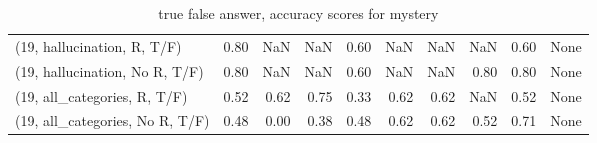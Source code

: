 \begin{table*}[h!]
\begin{adjustbox}{width=2\columnwidth,center}
\begin{tabular}{lrrr|rrr|rrr}
(19, hallucination, R, T/F)           &                      0.80 &                   NaN &                       NaN &                          0.60 &                       NaN &                           NaN &                                    NaN &                               0.60 &                                  None \\
(19, hallucination, No R, T/F)        &                      0.80 &                   NaN &                       NaN &                          0.60 &                       NaN &                           NaN &                                   0.80 &                               0.80 &                                  None \\
(19, all\_categories, R, T/F)          &                      0.52 &                  0.62 &                      0.75 &                          0.33 &                      0.62 &                          0.62 &                                    NaN &                               0.52 &                                  None \\
(19, all\_categories, No R, T/F)       &                      0.48 &                  0.00 &                      0.38 &                          0.48 &                      0.62 &                          0.62 &                                   0.52 &                               0.71 &                                  None \\


\bottomrule
\end{tabular}
\end{adjustbox}
\caption{true false answer, accuracy scores for mystery}
\end{table*}
